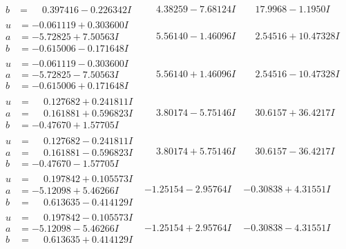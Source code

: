 \documentclass[1p]{elsarticle_modified}
\theoremstyle{definition}
\begin{document}
$$\begin{array}{c|c|c}
\begin{aligned}
b &= \phantom{-}0.397416 - 0.226342 I\end{aligned}
 & \phantom{-}4.38259 - 7.68124 I & \phantom{-}17.9968 - 1.1950 I \\ \hline\begin{aligned}
u &= -0.061119 + 0.303600 I \\
a &= -5.72825 + 7.50563 I \\
b &= -0.615006 - 0.171648 I\end{aligned}
 & \phantom{-}5.56140 - 1.46096 I & \phantom{-}2.54516 + 10.47328 I \\ \hline\begin{aligned}
u &= -0.061119 - 0.303600 I \\
a &= -5.72825 - 7.50563 I \\
b &= -0.615006 + 0.171648 I\end{aligned}
 & \phantom{-}5.56140 + 1.46096 I & \phantom{-}2.54516 - 10.47328 I \\ \hline\begin{aligned}
u &= \phantom{-}0.127682 + 0.241811 I \\
a &= \phantom{-}0.161881 + 0.596823 I \\
b &= -0.47670 + 1.57705 I\end{aligned}
 & \phantom{-}3.80174 - 5.75146 I & \phantom{-}30.6157 + 36.4217 I \\ \hline\begin{aligned}
u &= \phantom{-}0.127682 - 0.241811 I \\
a &= \phantom{-}0.161881 - 0.596823 I \\
b &= -0.47670 - 1.57705 I\end{aligned}
 & \phantom{-}3.80174 + 5.75146 I & \phantom{-}30.6157 - 36.4217 I \\ \hline\begin{aligned}
u &= \phantom{-}0.197842 + 0.105573 I \\
a &= -5.12098 + 5.46266 I \\
b &= \phantom{-}0.613635 - 0.414129 I\end{aligned}
 & -1.25154 - 2.95764 I & -0.30838 + 4.31551 I \\ \hline\begin{aligned}
u &= \phantom{-}0.197842 - 0.105573 I \\
a &= -5.12098 - 5.46266 I \\
b &= \phantom{-}0.613635 + 0.414129 I\end{aligned}
 & -1.25154 + 2.95764 I & -0.30838 - 4.31551 I \\ \hline\begin{aligned}

\end{aligned}
\end{array}$$
\end{document}
